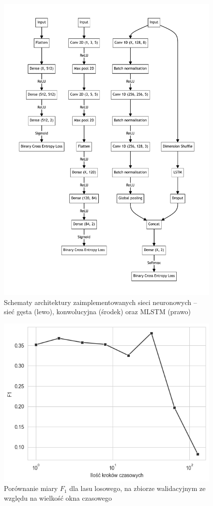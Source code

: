 \documentclass{./assets/wfis}
\begin{document}
\begin{figure}
    \centering
    \includegraphics[width=\columnwidth]{diagrams/network_arch.pdf}
    \caption[Schematy architektury zaimplementowanych sieci neuronowych]{Schematy architektury zaimplementowanych sieci neuronowych – sieć gęsta (lewo), konwolucyjna (środek) oraz MLSTM (prawo)}
    \label{fig:arch}
\end{figure}

\begin{figure}[h!]
    \centering
    \includegraphics[width=0.5\columnwidth]{thesis/assets/window_size_vs_f1.png}
    \caption{Porównanie miary $F_1$ dla lasu losowego, na zbiorze walidacyjnym ze względu na wielkość okna czasowego}
    \label{fig:window-size}
\end{figure}
\end{document}
